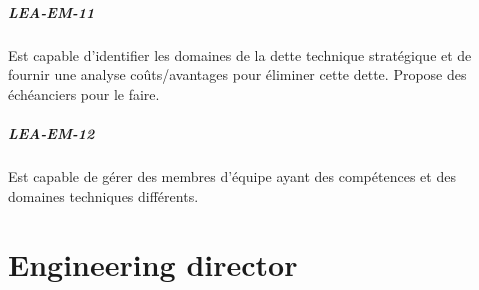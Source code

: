 \documentclass[a4paper, french, openany, 12pt]{book}
\newcommand\cha[1]{\textcolor{OliveGreen}{\textbf{\uppercase{lea-{#1}}}}}
\begin{document}
\begin{multicols}{2}
  \paragraph*{\cha{em-11}}

  Est capable d'identifier les domaines de la dette technique stratégique et de fournir une analyse coûts/avantages pour 
  éliminer cette dette.
  Propose des échéanciers pour le faire.
  
  \paragraph*{\cha{em-12}}

  Est capable de gérer des membres d'équipe ayant des compétences et des domaines techniques différents.

\end{multicols}

\chapter{Engineering director}
\end{document}
